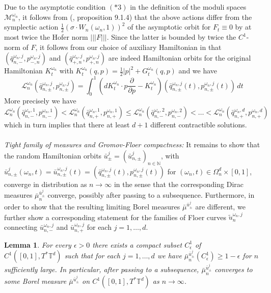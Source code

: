 \documentclass[a4paper,11pt]{amsart}
\newcommand{\NN}{\mathbb{N}}
\newcommand{\TT}{\mathbb{T}}
\newtheorem{lemma}[theorem]{Lemma}
\begin{document}
\indent Due to the asymptotic condition $(*3)$ in the definition of the moduli spaces $\mathcal{M}_n^{\omega_n}$, it follows from (\cite{MDSa}, proposition 9.1.4) that the above actions differ from the symplectic action $\frac{1}{2}(\sigma\cdot W_n(\omega_n,1))^2$ of the asymptotic orbit for $F_t\equiv 0$ by at most twice the Hofer norm $|||F|||$. Since the latter is bounded by twice the $C^1$-norm of $F$, it follows from our choice of auxiliary Hamiltonian in  that $(\bar{q}^{\omega_n,j}_{n,-},p^{\omega_n,j}_{-,n})$ and $(\bar{q}^{\omega_n,j}_{+,n},p^{\omega_n,j}_{+,n})$ are indeed Hamiltonian orbits for the original Hamiltonian $K_t^{\omega_n}$ with $K_t^{\omega_n}(q,p)=\frac{1}{2}|p|^2+G_t^{\omega_n}(q,p)$ and we have \[\mathcal{L}_n^{\omega_n}(\bar{q}^{\omega_n,j}_{n,\pm},p^{\omega_n,j}_{n,\pm})=\int_0^1 \left( dK^{\omega_n}_t\cdot p\frac{\partial}{\partial p}-K^{\omega_n}_t\right)(\bar{q}^{\omega_n,j}_{n,\pm}(t),p^{\omega_n,j}_{n,\pm}(t))\,dt\]
More precisely we have \[\mathcal{L}_n^{\omega_n}(\bar{q}^{\omega_n,1}_{n,-},p^{\omega_n,1}_{n,-})<\mathcal{L}_n^{\omega_n}(\bar{q}^{\omega_n,1}_{n,+},p^{\omega_n,1}_{n,+})\leq \mathcal{L}_n^{\omega_n}(\bar{q}^{\omega_n,2}_{n,-},p^{\omega_n,2}_{n,-})<\ldots<\mathcal{L}_n^{\omega_n}(\bar{q}^{\omega_n,d}_{n,+},p^{\omega_n,d}_{n,+})\] which in turn implies that there at least $d+1$ different contractible solutions.\\
\\  
\noindent\emph{Tight family of measures and Gromov-Floer compactness:} It remains to show that the random Hamiltonian orbits $\bar{u}^j_{\pm}=(\bar{u}^j_{n,\pm})_{n\in\NN}$, with $\bar{u}^j_{n,\pm}(\omega_n,t)=\bar{u}^{\omega_n,j}_{n,\pm}(t)=(\bar{q}^{\omega_n,j}_{n,\pm}(t),p^{\omega_n,j}_{n,\pm}(t))$ for $(\omega_n,t)\in\Omega_n^d\times [0,1]$, converge in distribution as $n\to\infty$ in the sense that the corresponding Dirac measures $\bar{\mu}^{\bar{u}^j_\pm}_n$ converge, possibly after passing to a subsequence. Furthermore, in order to show that the resulting limiting Borel measures $\bar{\mu}^{\bar{u}^j_\pm}$ are different, we further show a corresponding statement for the families of Floer curves $\widetilde{u}^{\omega_n,j}_n$ connecting $\bar{u}^{\omega_n,j}_{n,-}$ and $\bar{u}^{\omega_n,j}_{n,+}$ for each $j=1,\ldots,d$.
\begin{lemma}\label{tight}
    For every $\epsilon>0$ there exists a compact subset $C^1_{\epsilon}$ of $C^1([0,1],T^*\TT^d)$ such that for each $j=1,\ldots,d$ we have $\bar{\mu}^{\bar{u}^j_\pm}_n(C^1_{\epsilon})\geq 1-\epsilon$ for $n$ sufficiently large. In particular, after passing to a subsequence, $\bar{\mu}^{\bar{u}^j_\pm}_n$ converges to some Borel measure $\bar{\mu}^{\bar{u}^j_\pm}$ on $C^1([0,1],T^*\TT^d)$ as $n\to\infty$. 
\end{lemma}
\end{document}
